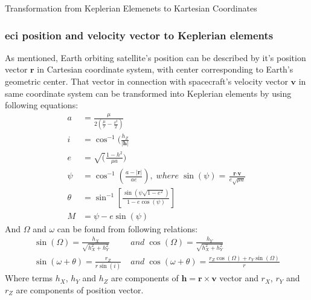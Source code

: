         Transformation from Keplerian Elemenets to Kartesian Coordinates

        
        \subsubsection{\ac{eci} position and velocity vector to Keplerian elements}
            As mentioned, Earth orbiting satellite's position can be described by it's position vector $\textbf{r}$ in Cartesian coordinate system, with center corresponding to Earth's geometric center. That vector in connection with spacecraft's velocity vector $\textbf{v}$ in same coordinate system can be transformed into Keplerian elements by using following equations:
            \begin{align}
                a &= \frac{\mu}{2\left(\frac{\mu}{r}-\frac{v^2}{2}\right)} \\
                i &= \cos^{-1}(\frac{h_Z}{|\textbf{h}|} \\
                e &= \sqrt(\frac{1-h^2}{\mu a}) \\
                \psi &= \cos^{-1}\left(\frac{a-|\textbf{r}|}{ae}\right), \; where \; \sin(\psi) = \frac{\textbf{r}\cdot\textbf{v}}{e\sqrt{\mu a}} \\
                \theta &= \sin^{-1}\left[\frac{\sin(\psi \sqrt{1-e^2})}{1-e\cos(\psi)}\right] \\
                M & = \psi - e\sin(\psi)
            \end{align}
            And $\Omega$ and $\omega$ can be found from following relations:
            \begin{align}
                \sin(\Omega) = \frac{h_X}{\sqrt{h^2_X+h^2_Y}}\; & and\; \cos(\Omega) = \frac{h_Y}{\sqrt{h^2_X+h^2_Y}} \\
                \sin(\omega+\theta) = \frac{r_Z}{r\sin(i)}\; & and\; \cos(\omega+\theta) = \frac{r_Z\cos(\Omega)+r_Y\sin(\Omega)}{r}
            \end{align}
            Where terms $h_X$, $h_Y$ and $h_Z$ are components of $\textbf{h}=\textbf{r}\times \textbf{v}$ vector and $r_X$, $r_Y$ and $r_Z$ are components of position vector.
        
